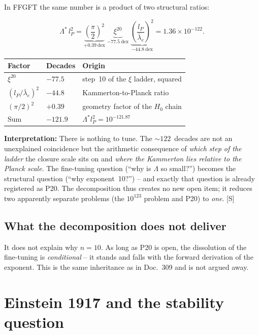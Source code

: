 \documentclass[11pt]{report}
\begin{document}
In FFGFT the same number is a product of two structural ratios:

\begin{equation}
  \Lambda^{*}\,l_P^{2}
  = \underbrace{\left(\frac{\pi}{2}\right)^{2}}_{+0.39~\text{dex}}
    \;\underbrace{\xi^{20}}_{-77.5~\text{dex}}
    \;\underbrace{\left(\frac{l_P}{\bar\lambda_e}\right)^{2}}_{-44.8~\text{dex}}
  = 1.36\times10^{-122}.
  \label{eq:decomp}
\end{equation}

\begin{center}
\begin{tabular}{lll}
\toprule
Factor & Decades & Origin \\
\midrule
$\xi^{20}$ & $-77.5$ & step~10 of the $\xi$ ladder, squared \\
$(l_P/\bar\lambda_e)^2$ & $-44.8$ & Kammerton-to-Planck ratio \\
$(\pi/2)^2$ & $+0.39$ & geometry factor of the $H_0$ chain \\
\midrule
Sum & $-121.9$ & $\Lambda^{*}l_P^2 = 10^{-121.87}$ \\
\bottomrule
\end{tabular}
\end{center}

\textbf{Interpretation:} There is nothing to tune. The
$\sim\!122$~decades are not an unexplained coincidence but the
arithmetic consequence of \emph{which step of the ladder} the
closure scale sits on and \emph{where the Kammerton lies relative
to the Planck scale}. The fine-tuning question
(\enquote{why is $\Lambda$ so small?}) becomes the structural
question (\enquote{why exponent~10?}) -- and exactly that question
is already registered as P20. The decomposition thus creates no new
open item; it reduces two apparently separate problems (the
$10^{123}$ problem and P20) to \emph{one}. [S]

\section{What the decomposition does not deliver}

It does not explain why $n=10$. As long as P20 is open, the
dissolution of the fine-tuning is \emph{conditional} -- it stands
and falls with the forward derivation of the exponent. This is the
same inheritance as in Doc.~309 and is not argued away.

\chapter{Einstein 1917 and the stability question}
\label{ch:einstein1917}
\end{document}
